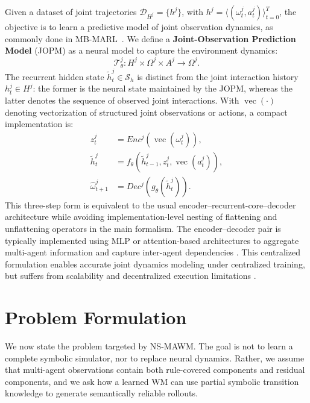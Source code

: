 \documentclass{article}
\theoremstyle{plain}
\theoremstyle{definition}
\theoremstyle{remark}
\begin{document}
Given a dataset of joint trajectories $\mathcal{D}_{H^j} = \{ h^j \}$, with $h^j = \langle (\omega_t^j, a_t^j) \rangle_{t=0}^{T}$, the objective is to learn a predictive model of joint observation dynamics, as commonly done in MB-MARL~\cite{Wang2022modelbasedmultiagentreinforcementlearning,Xu2022mingling}.
%
We define a \textbf{Joint-Observation Prediction Model} (JOPM) as a neural model to capture the environment dynamics:
%
\begin{equation}
  \mathcal{T}_{\theta}^j :
  H^j \times \Omega^j \times A^j
  \rightarrow \Omega^j .
  \label{eq:jopm_type}
\end{equation}
%
The recurrent hidden state $\tilde{h}_t^j\in\mathcal{S}_h$ is distinct from the joint interaction history $h_t^j\in H^j$: the former is the neural state maintained by the JOPM, whereas the latter denotes the sequence of observed joint interactions. With $\operatorname{vec}(\cdot)$ denoting vectorization of structured joint observations or actions, a compact implementation is:
\begin{align}
  z_t^j                & = Enc^j(\operatorname{vec}(\omega_t^j)), \label{eq:mawm_encode}                              \\
  \tilde{h}_t^j        & = f_{\theta}(\tilde{h}_{t-1}^j, z_t^j, \operatorname{vec}(a_t^j)), \label{eq:mawm_recurrent} \\
  \hat{\omega}_{t+1}^j & = Dec^j(g_{\theta}(\tilde{h}_t^j)). \label{eq:mawm_decode}
\end{align}
This three-step form is equivalent to the usual encoder--recurrent-core--decoder architecture while avoiding implementation-level nesting of flattening and unflattening operators in the main formalism.
%
The encoder--decoder pair is typically implemented using MLP or attention-based architectures
to aggregate multi-agent information and capture inter-agent dependencies
\cite{Xu2022mingling,Wang2022modelbasedmultiagentreinforcementlearning}.
This centralized formulation enables accurate joint dynamics modeling under centralized training,
but suffers from scalability and decentralized execution limitations
\cite{Wang2022modelbasedmultiagentreinforcementlearning,Moerland2023modelbased}.


\section{Problem Formulation}
\label{sec:problem}

We now state the problem targeted by NS-MAWM. The goal is not to learn a complete symbolic simulator, nor to replace neural dynamics. Rather, we assume that multi-agent observations contain both rule-covered components and residual components, and we ask how a learned WM can use partial symbolic transition knowledge to generate semantically reliable rollouts.
\end{document}
